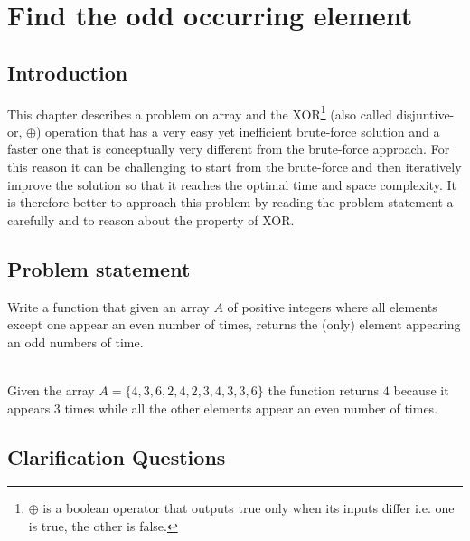 %

\chapter{Find the odd occurring element}
\label{ch:find_odd_occurring_element}
\section*{Introduction}
This chapter describes a problem on array and the XOR\footnote{$\oplus$ is a boolean operator that outputs true only when its inputs differ i.e. one is true, the other is false.} (also called disjuntive-or, $\oplus$) operation that has a very easy yet inefficient  brute-force solution and a faster one that is conceptually very different from the brute-force approach. For this reason it can be challenging to start from the brute-force and then iteratively improve the solution so that it reaches the optimal time and space complexity. It is therefore better to approach this problem by reading the problem statement a carefully and to reason about the property of XOR. 

\section{Problem statement}
\begin{exercise}
Write a function that given an array $A$ of positive integers where all elements except one appear an even number of times, returns the (only) element appearing an odd numbers of time.
\end{exercise}


\begin{example}
	\hfill \\
Given the array $A=\{4,3,6,2,4,2,3,4,3,3,6\}$ the function returns $4$ because it appears $3$ times while all the other elements appear an even number of times.

\end{example}


\section{Clarification Questions}

